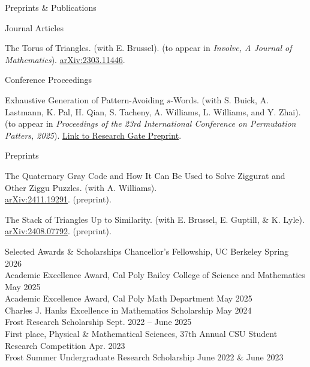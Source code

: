 \documentclass[
	11pt, %
]{cv} %
\begin{document}
\begin{rSection}{Preprints \& Publications}
	\begin{rSubsectionNumbered}{Journal Articles}
		\item The Torus of Triangles. (with E. Brussel). (to appear in \emph{Involve, A Journal of Mathematics}).	\href{http://arxiv.org/abs/2303.11446}{arXiv:2303.11446}.	
	\end{rSubsectionNumbered}
	\begin{rSubsectionNumbered}{Conference Proceedings}
		\item Exhaustive Generation of Pattern-Avoiding $s$-Words. (with S. Buick, A. Lastmann, K. Pal, H. Qian, S. Tacheny, A. Williams, L. Williams, and Y. Zhai). (to appear in \textit{Proceedings of the 23rd International Conference on Permutation Patters, 2025}). \href{https://www.researchgate.net/publication/391522113_Exhaustive_Generation_of_Pattern-Avoiding_s-Words}{Link to \underline{Research Gate Preprint}}.
	\end{rSubsectionNumbered}
	\begin{rSubsectionNumbered}{Preprints}
		\item The Quaternary Gray Code and How It Can Be Used to Solve Ziggurat and Other Ziggu Puzzles. (with A. Williams).\\ \href{http://arxiv.org/abs/2411.19291}{arXiv:2411.19291}. (preprint).
		\item The Stack of Triangles Up to Similarity. (with E. Brussel, E. Guptill, \& K. Lyle). \href{http://arxiv.org/abs/2408.07792}{arXiv:2408.07792}. (preprint).		
	\end{rSubsectionNumbered}
\end{rSection}
\begin{rSection}{Selected Awards \& Scholarships}
	Chancellor's Fellowship, UC Berkeley \dotfill Spring 2026 \\
	Academic Excellence Award, Cal Poly Bailey College of Science and Mathematics \dotfill May 2025 \\
	Academic Excellence Award, Cal Poly Math Department \dotfill May 2025 \\
	Charles J. Hanks Excellence in Mathematics Scholarship \dotfill May 2024 \\
	Frost Research Scholarship \dotfill Sept. 2022 -- June 2025 \\
	First place, Physical \& Mathematical Sciences, 37th Annual CSU Student Research Competition \dotfill Apr. 2023 \\
	Frost Summer Undergraduate Research Scholarship \dotfill June 2022 \& June 2023
\end{rSection}
\end{document}
